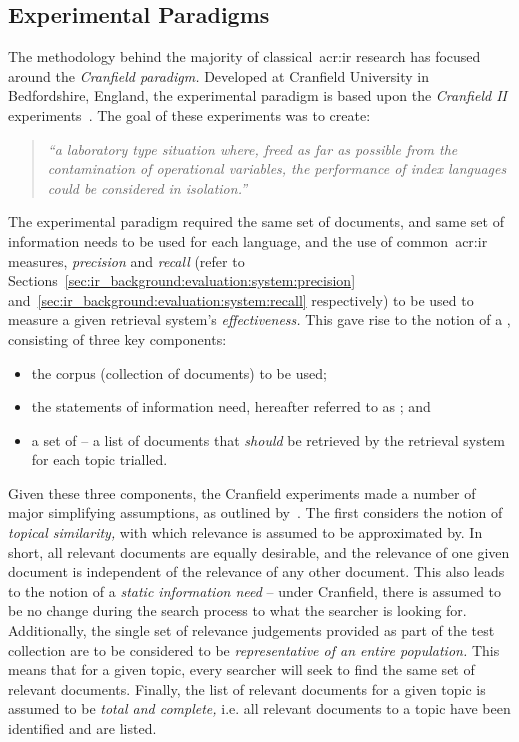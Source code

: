 \subsection{Experimental Paradigms}\label{sec:ir_background:paradigms}
The methodology behind the majority of classical~\gls{acr:ir} research has focused around the \emph{Cranfield paradigm.} Developed at Cranfield University in Bedfordshire, England, the experimental paradigm is based upon the \emph{Cranfield II} experiments~\citep{aslib1966factors}. The goal of these experiments was to create:

\begin{quote}
\emph{``a laboratory type situation where, freed as far as possible from the contamination of operational variables, the performance of index languages could be considered in isolation.''}
\end{quote}

The experimental paradigm required the same set of documents, and same set of information needs to be used for each language, and the use of common~\gls{acr:ir} measures, \emph{precision} and \emph{recall} (refer to Sections~\ref{sec:ir_background:evaluation:system:precision} and~\ref{sec:ir_background:evaluation:system:recall} respectively) to be used to measure a given retrieval system's \emph{effectiveness.} This gave rise to the notion of a , consisting of three key components:

\begin{itemize}
    \item{the corpus (collection of documents) to be used;}
    \item{the statements of information need, hereafter referred to as ; and}
    \item{a set of  -- a list of documents that \emph{should} be retrieved by the retrieval system for each topic trialled.}
\end{itemize}

Given these three components, the Cranfield experiments made a number of major simplifying assumptions, as outlined by~\cite{voorhees2001iir_philosophy}. The first considers the notion of \emph{topical similarity,} with which relevance is assumed to be approximated by. In short, all relevant documents are equally desirable, and the relevance of one given document is independent of the relevance of any other document. This also leads to the notion of a \emph{static information need} -- under Cranfield, there is assumed to be no change during the search process to what the searcher is looking for. Additionally, the single set of relevance judgements provided as part of the test collection are to be considered to be \emph{representative of an entire population.} This means that for a given topic, every searcher will seek to find the same set of relevant documents. Finally, the list of relevant documents for a given topic is assumed to be \emph{total and complete,} i.e. all relevant documents to a topic have been identified and are listed.

